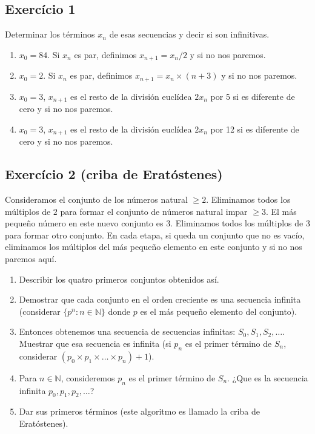 \subsection*{Exercício 1}

Determinar los términos $x_n$ de esas secuencias y decir si son infinitivas.

\begin{enumerate}
\item $x_0 = 84$. Si $x_n$ es par, definimos $x_{n+1} = x_n / 2$ y si no nos
  paremos.
\item $x_0 = 2$. Si $x_n$ es par, definimos $x_{n+1} = x_n \times {(n+3)}$ y si
  no nos paremos.
\item $x_0 = 3$, $x_{n+1}$ es el resto de la división euclídea $2 x_n$ por 5 si
  es diferente de cero y si no nos paremos.
\item $x_0 = 3$, $x_{n+1}$ es el resto de la división euclídea $2 x_n$ por 12 si
  es diferente de cero y si no nos paremos.
\end{enumerate}

\subsection*{Exercício 2 (criba de Eratóstenes)}

Consideramos el conjunto de los números natural $\geq 2$. Eliminamos todos
los múltiplos de $2$ para formar el conjunto de números natural impar $\geq 3$.
El más pequeño número en este nuevo conjunto es $3$. Eliminamos todos
los múltiplos de $3$ para formar otro conjunto. En cada etapa, si queda un
conjunto que no es vacío, eliminamos los múltiplos del más pequeño elemento
en este conjunto y si no nos paremos aquí.

\begin{enumerate}
\item Describir los quatro primeros conjuntos obtenidos así.
\item Demostrar que cada conjunto en el orden creciente es una secuencia
  infinita (considerar $\{ p^n : n \in \mathbb N\}$ donde $p$ es el más
  pequeño elemento del conjunto).
\item Entonces obtenemos una secuencia de secuencias infinitas:
  $S_0, S_1, S_2, \ldots$. Muestrar que esa secuencia es infinita
  (si $p_n$ es el primer término de $S_n$, considerar
  $\left(p_0 \times p_1 \times \ldots \times p_n\right) + 1$).
\item Para $n \in \mathbb N$, consideremos $p_n$ es el primer término de $S_n$.
  ¿Que es la secuencia infinita $p_0, p_1, p_2, \ldots$?
\item Dar sus primeros términos (este algoritmo es llamado la criba de
  Eratóstenes).
\end{enumerate}

